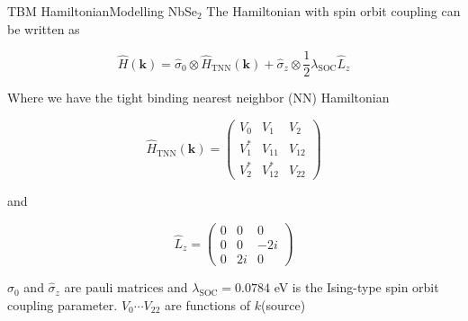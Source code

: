 \documentclass[9pt]{beamer}
\begin{document}
\begin{frame}{TBM Hamiltonian}{Modelling NbSe$_2$}
  The Hamiltonian with spin orbit coupling can be written as

  \begin{equation}
    \hat{H}(\boldsymbol{k})=\hat{\sigma}_{0} \otimes \hat{H}_{\mathrm{TNN}}(\boldsymbol{k})+\hat{\sigma}_{z} \otimes \frac{1}{2} \lambda_{\mathrm{SOC}} \hat{L}_{z}
  \end{equation}

  Where we have the tight binding nearest neighbor (NN) Hamiltonian

  \begin{equation}
    \hat{H}_{\mathrm{TNN}}(\boldsymbol{k})=\left(\begin{array}{ccc}
    V_{0} & V_{1} & V_{2} \\
    V_{1}^{*} & V_{11} & V_{12} \\
    V_{2}^{*} & V_{12}^{*} & V_{22}
    \end{array}\right)
  \end{equation}

  and

  \begin{equation}
    \hat{L}_{z}=\left(\begin{array}{ccc}
    0 & 0 & 0 \\
    0 & 0 & -2 i \\
    0 & 2 i & 0
    \end{array}\right)
  \end{equation}

  $\hat{\sigma}_0$ and $\hat{\sigma}_z$ are pauli matrices and $\lambda_{\text{SOC}}=0.0784$ eV is the Ising-type spin orbit coupling parameter. $V_0 \cdots V_{22}$ are functions of $k$(source)
\end{frame}
\end{document}
